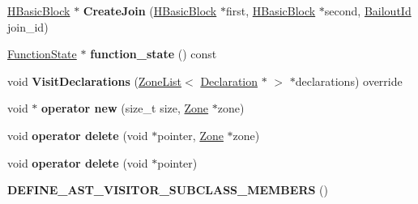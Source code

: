 \begin{DoxyCompactItemize}
\item 
\hyperlink{classv8_1_1internal_1_1_h_basic_block}{H\+Basic\+Block} $\ast$ {\bfseries Create\+Join} (\hyperlink{classv8_1_1internal_1_1_h_basic_block}{H\+Basic\+Block} $\ast$first, \hyperlink{classv8_1_1internal_1_1_h_basic_block}{H\+Basic\+Block} $\ast$second, \hyperlink{classv8_1_1internal_1_1_bailout_id}{Bailout\+Id} join\+\_\+id)\hypertarget{classv8_1_1internal_1_1_h_optimized_graph_builder_a2116016b8dca57b3ae2fe6c69f822e85}{}\label{classv8_1_1internal_1_1_h_optimized_graph_builder_a2116016b8dca57b3ae2fe6c69f822e85}

\item 
\hyperlink{classv8_1_1internal_1_1_function_state}{Function\+State} $\ast$ {\bfseries function\+\_\+state} () const \hypertarget{classv8_1_1internal_1_1_h_optimized_graph_builder_a7d9d56cc7e3d52edcd21871ca352592d}{}\label{classv8_1_1internal_1_1_h_optimized_graph_builder_a7d9d56cc7e3d52edcd21871ca352592d}

\item 
void {\bfseries Visit\+Declarations} (\hyperlink{classv8_1_1internal_1_1_zone_list}{Zone\+List}$<$ \hyperlink{classv8_1_1internal_1_1_declaration}{Declaration} $\ast$ $>$ $\ast$declarations) override\hypertarget{classv8_1_1internal_1_1_h_optimized_graph_builder_a5dec8e63c2d1d3a0495ff91513d3674b}{}\label{classv8_1_1internal_1_1_h_optimized_graph_builder_a5dec8e63c2d1d3a0495ff91513d3674b}

\item 
void $\ast$ {\bfseries operator new} (size\+\_\+t size, \hyperlink{classv8_1_1internal_1_1_zone}{Zone} $\ast$zone)\hypertarget{classv8_1_1internal_1_1_h_optimized_graph_builder_ab355eb3eac87f188f0f80bbd04d0bf0c}{}\label{classv8_1_1internal_1_1_h_optimized_graph_builder_ab355eb3eac87f188f0f80bbd04d0bf0c}

\item 
void {\bfseries operator delete} (void $\ast$pointer, \hyperlink{classv8_1_1internal_1_1_zone}{Zone} $\ast$zone)\hypertarget{classv8_1_1internal_1_1_h_optimized_graph_builder_a7f726be397501d3f87ecf26a0f6d5edc}{}\label{classv8_1_1internal_1_1_h_optimized_graph_builder_a7f726be397501d3f87ecf26a0f6d5edc}

\item 
void {\bfseries operator delete} (void $\ast$pointer)\hypertarget{classv8_1_1internal_1_1_h_optimized_graph_builder_a852e01517e9d8f200e799ce900b9bd14}{}\label{classv8_1_1internal_1_1_h_optimized_graph_builder_a852e01517e9d8f200e799ce900b9bd14}

\item 
{\bfseries D\+E\+F\+I\+N\+E\+\_\+\+A\+S\+T\+\_\+\+V\+I\+S\+I\+T\+O\+R\+\_\+\+S\+U\+B\+C\+L\+A\+S\+S\+\_\+\+M\+E\+M\+B\+E\+RS} ()\hypertarget{classv8_1_1internal_1_1_h_optimized_graph_builder_ae7491f10a834982c6c4e2838c22af37b}{}\label{classv8_1_1internal_1_1_h_optimized_graph_builder_ae7491f10a834982c6c4e2838c22af37b}

\end{DoxyCompactItemize}
